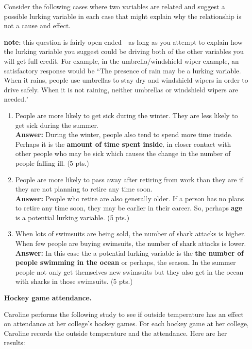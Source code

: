\documentclass[11pt]{article}
\newcommand{\ben}{\begin{enumerate}}
\newcommand{\een}{\end{enumerate}}
\newcommand{\ans}[1]{{\color{blue} \textbf{Answer: } #1 (5 pts.)}}
\begin{document}
   Consider the following cases where two variables are related and suggest a possible lurking variable in each case that might explain why the relationship is not a cause and effect.

   \textbf{note}: this question is fairly open ended - as long as you attempt to explain how the lurking variable you suggest could be driving both of the other variables you will get full credit. For example, in the umbrella/windshield wiper example, an satisfactory response would be ``The presence of rain may be a lurking variable. When it rains, people use umbrellas to stay dry and windshield wipers in order to drive safely. When it is not raining, neither umbrellas or windshield wipers are needed."

   \ben
   \item People are more likely to get sick during the winter. They are less likely to get sick during the summer. \\
   \ans{ During the winter, people also tend to spend more time inside. Perhaps it is the \textbf{amount of time spent inside}, in closer contact with other people who may be sick which causes the change in the number of people falling ill.}

   \item People are more likely to pass away after retiring from work than they are if they are not planning to retire any time soon. \\
   \ans{People who retire are also generally older. If a person has no plans to retire any time soon, they may be earlier in their career. So, perhaps \textbf{age} is a potential lurking variable.}
 
   \item When lots of swimsuits are being sold, the number of shark attacks is higher. When few people are buying swimsuits, the number of shark attacks is lower. \\
   \ans{In this case the a potential lurking variable is the \textbf{the number of people swimming in the ocean} or perhaps, the season. In the summer people not only get themselves new swimsuits but they also get in the ocean with sharks in those swimsuits.}
   \een



\item \textbf{Hockey game attendance.}

Caroline performs the following study to see if outside temperature
has an effect on attendance at her college's hockey games. For each
hockey game at her college, Caroline records the outside temperature and the attendance. Here are her results:
\end{document}
